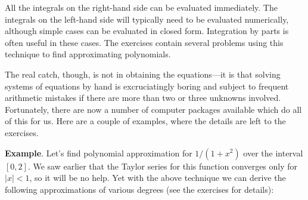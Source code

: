 {{{{\noindent
\begin{center}
\end{center}

All the integrals on the right-hand side can be evaluated immediately.  The integrals on the left-hand side will typically need to be evaluated numerically, although simple cases can be evaluated in closed form.  Integration by parts is often useful in these cases.  The exercises contain several problems using this technique to find approximating polynomials.  

The real catch, though, is not in obtaining the 
equations---it is that solving systems of equations by hand is excruciatingly boring and subject to frequent arithmetic mistakes if there are more than two or three unknowns involved.  Fortunately, there are now a number of computer packages available which do all of this for us.  Here are a couple of examples, where the details are left to the exercises.

\medskip



{\bf Example}.  Let's find polynomial approximation for \mbox{$1/(1+x^2)$} over the interval $[0, 2]$.  We saw earlier that the Taylor series for  this function converges only for $|x|<1$, so it will be no help.  Yet with the above technique we can derive the following approximations of various degrees (see the exercises for details):

}}}}
